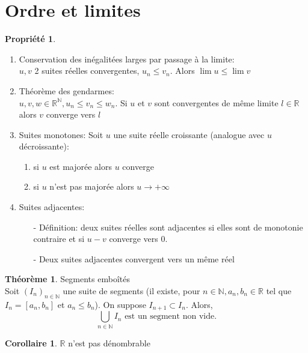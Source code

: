 \documentclass[fleqn]{article}
\theoremstyle{definition} \newtheorem*{defi}{D\'efinition}
\theoremstyle{definition} \newtheorem*{theo}{Th\'eor\`eme}
\theoremstyle{definition} \newtheorem*{prop}{Propri\'et\'e}
\theoremstyle{definition} \newtheorem*{coro}{Corollaire}
\theoremstyle{remark} \newtheorem*{rqs}{Remarque}
\begin{document}
\section{Ordre et limites}
\begin{prop} $ $
	\begin{enumerate}
		\item Conservation des in\'egalit\'ees larges par passage \`a la limite: \\
			$u, v$ 2 suites r\'eelles convergentes, $u_n \leq v_n$. Alors $\lim u \leq \lim v$
		\item Th\'eor\`eme des gendarmes: \\
			$u, v, w \in \mathbb{R}^\mathbb{N}, u_n \leq v_n \leq w_n$. Si $u$ et $v$ sont convergentes de m\^eme limite $l \in \mathbb{R}$
			alors $v$ converge vers $l$
		\item Suites monotones:
			Soit $u$ une suite r\'eelle croissante (analogue avec $u$ d\'ecroissante):
			\begin{enumerate}
				\item si $u$ est major\'ee alors $u$ converge
				\item si $u$ n'est pas major\'ee alors $u \rightarrow +\infty$
			\end{enumerate}
		\item Suites adjacentes:
			\begin{itemize}
				\item [-] D\'efinition: deux suites r\'eelles sont adjacentes si elles sont de monotonie contraire et si $u-v$ converge vers 0.
				\item [-] Deux suites adjacentes convergent vers un m\^eme r\'eel
			\end{itemize}
	\end{enumerate}
\end{prop}
\begin{theo} Segments embo\^it\'es \\
	Soit $(I_n)_{n \in \mathbb{N}}$ une suite de segments (il existe, pour
	$n \in \mathbb{N}, a_n, b_n \in \mathbb{R}$ tel que $I_n = [a_n, b_n]$ et $a_n \leq b_n$). On suppose $I_{n+1} \subset I_n$. Alors,
	\[\bigcup_{n \in \mathbb{N}} I_n \text{ est un segment non vide.}\]
\end{theo}
\begin{coro}
	$\mathbb{R}$ n'est pas d\'enombrable
\end{coro}
\end{document}
